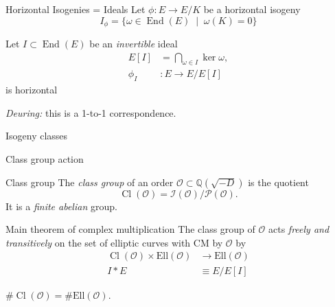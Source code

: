 \documentclass[aspectratio=169]{beamer}
\newcommand{\Q}{ℚ}
\renewcommand{\O}{\mathcal{O}}
\newcommand{\End}{\operatorname{End}}
\newcommand{\Hom}{\operatorname{Hom}}
\newcommand{\Cl}{\operatorname{Cl}}
\begin{document}

\begin{frame}{Horizontal Isogenies = Ideals}
  \large
  Let \emph{$\phi : E → E/K$} be a horizontal isogeny
  \bigskip
  \[I_\phi = \{ ω ∈ \End(E) \;\mid\; ω(K) = 0 \}\]

  \bigskip
  
  Let \emph{$I ⊂ \End(E)$} be an \textit{invertible} ideal
  \begin{align*}
    E[I] &= \bigcap_{ω∈I} \ker ω,\\
    \phi_I &: E → E/E[I]
  \end{align*}
  is horizontal
  
  \bigskip

  \emph{Deuring:} this is a 1-to-1 correspondence.
\end{frame}


\begin{frame}{Isogeny classes}
  \centering
\end{frame}


\begin{frame}{Class group action}
  \begin{block}{Class group}
    The \emph{class group} of an order $\O\subset\Q(\sqrt{-D})$ is the
    quotient
    \[\Cl(\O) = \mathcal{I}(\O) / \mathcal{P}(\O).\]
    It is a \emph{finite abelian} group.
  \end{block}

  \begin{block}{Main theorem of complex multiplication}
    The class group of $\O$ acts \emph{freely and transitively} on
    the set of elliptic curves with CM by $\O$ by
    \begin{align*}
      \Cl(\O) \times \mathrm{Ell}(\O) &\to \mathrm{Ell}(\O)\\
      I * E &≡ E/E[I]
    \end{align*}
  \end{block}

  \begin{corollary}
    \centering
    $\#\Cl(\O) = \#\mathrm{Ell}(\O)$.
  \end{corollary}
\end{frame}
\end{document}
